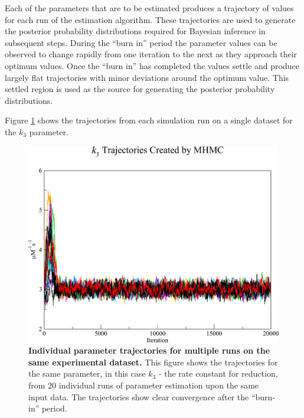 Each of the parameters that are to be estimated produces a trajectory of values for each run of the estimation algorithm. These trajectories are used to generate the posterior probability distributions required for Bayesian inference in subsequent steps. During the ``burn in'' period the parameter values can be observed to change rapidly from one iteration to the next as they approach their optimum values. Once the ``burn in'' has completed the values settle and produce largely flat trajectories with minor deviations around the optimum value. This settled region is used as the source for generating the posterior probability distributions.

Figure \ref{fig:k3s} shows the trajectories from each simulation run on a single dataset for the $k_3$ parameter.

\begin{figure}[p]
 \centering
 \includegraphics[width=14cm]{./05-oxygenreduction/data/k3s1.pdf}
 \caption[Individual parameter trajectories for multiple runs on the same experimental dataset]{{\bf Individual parameter trajectories for multiple runs on the same experimental dataset.} This figure shows the trajectories for the same parameter, in this case $k_3$ - the rate constant for \cbbthree{} reduction, from 20 individual runs of parameter estimation upon the same input data. The trajectories show clear convergence after the ``burn-in'' period.
 \label{fig:k3s}}
\end{figure}
\afterpage{\clearpage}

